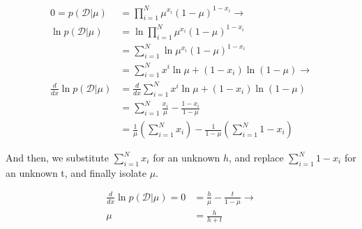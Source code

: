 \documentclass{tufte-handout}
\begin{document}
\begin{equation}
  \begin{aligned}
    0 = p(\mathcal{D}|\mu)              &= \prod\limits_{i = 1}^N \mu^{x_i}(1 - \mu)^{1 - x_i} \rightarrow \\
    \ln p(\mathcal{D}|\mu)              &= \ln \prod\limits_{i = 1}^N \mu^{x_i}(1 - \mu)^{1 - x_i} \\
                                        &= \sum\limits_{i = 1}^N \ln \mu^{x_i}(1 - \mu)^{1 - x_i} \\
                                        &= \sum\limits_{i = 1}^N x^i \ln \mu + (1 - x_i)\ln (1 - \mu) \rightarrow \\
    \frac{d}{dx} \ln p(\mathcal{D}|\mu) &= \frac{d}{dx} \sum\limits_{i = 1}^N x^i \ln \mu + (1 - x_i)\ln (1 - \mu) \\
                                        &= \sum\limits_{i = 1}^N \frac{x_i}{\mu} - \frac{1 - x_i}{1 - \mu} \\
                                        &= \frac{1}{\mu} (\sum\limits_{i = 1}^N x_i) - \frac{1}{1 - \mu}(\sum\limits_{i = 1}^N1 - x_i)
  \end{aligned}
\end{equation}

And then, we substitute $\sum\limits_{i = 1}^Nx_i$ for an unknown $h$, and
replace $\sum\limits_{i = 1}^N1-x_i$ for an unknown t, and finally isolate $\mu$.

\begin{equation}
  \begin{aligned}
    \frac{d}{dx} \ln p(\mathcal{D}|\mu) = 0 &= \frac{h}{\mu} - \frac{t}{1 - \mu} \rightarrow \\
    \mu &= \frac{h}{h + t}
  \end{aligned}
\end{equation}

% 
% 
\end{document}

